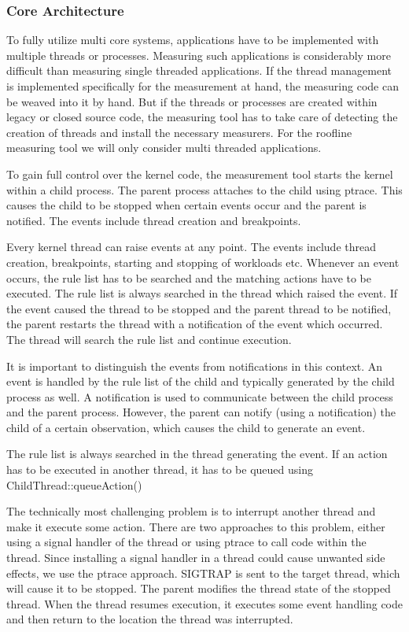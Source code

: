 \documentclass[a4paper,12pt]{article}
\newcommand{\method}[1]{\textsf{#1}}
\begin{document}
\subsubsection{Core Architecture}
To fully utilize multi core systems, applications have to be implemented with
multiple threads or processes. Measuring such applications is considerably more
difficult than measuring single threaded applications. If the thread management
is implemented specifically for the measurement at hand, the measuring code can
be weaved into it by hand. But if the threads or processes are created within
legacy or closed source code, the measuring tool has to take care of detecting
the creation of threads and install the necessary measurers. For the roofline
measuring tool we will only consider multi threaded applications.

To gain full control over the kernel code, the measurement tool starts the
kernel within a child process. The parent process attaches to the child using
ptrace. This causes the child to be stopped when certain events occur and the
parent is notified. The events include thread creation and breakpoints.

Every kernel thread can raise events at any point. The events include thread
creation, breakpoints, starting and stopping of workloads etc. Whenever an event
occurs, the rule list has to be searched and the matching actions have to be
executed. The rule list is always searched in the thread which raised the event.
If the event caused the thread to be stopped and the parent thread to be
notified, the parent restarts the thread with a notification of the event which
occurred. The thread will search the rule list and continue execution.

It is important to distinguish the events from notifications in this context. An
event is handled by the rule list of the child and typically generated by the
child process as well. A notification is used to communicate between the child
process and the parent process. However, the parent can notify (using a
notification) the child of a certain observation, which causes the child to
generate an event.

The rule list is always searched in the thread generating the event. If an
action has to be executed in another thread, it has to be queued using
\method{ChildThread::queueAction()}

The technically most challenging problem is to interrupt another thread and make
it execute some action. There are two approaches to this problem, either using a
signal handler of the thread or using ptrace to call code within the thread.
Since installing a signal handler in a thread could cause unwanted side effects,
we use the ptrace approach. SIGTRAP is sent to the target thread, which will
cause it to be stopped. The parent modifies the thread state of the stopped
thread. When the thread resumes execution, it executes some event handling code
and then return to the location the thread was interrupted.
\end{document}
